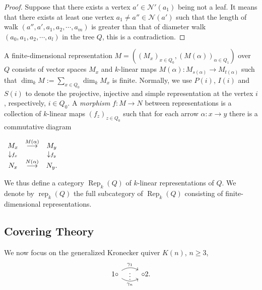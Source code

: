 \documentclass[a4paper,12pt]{amsart}
\DeclareMathOperator{\rep}{rep}
\DeclareMathOperator{\Rep}{Rep}
\begin{document}
\begin{proof}
Suppose that there exists a vertex $a'\in \mathcal{N}'(a_1) $ being not a leaf. It  means that there  exists at least one vertex $a_1 \neq a''\in \mathcal{N}(a')$ such that the length of walk $(a'', a', a_1, a_2, \cdots, a_m)$ is greater than that of diameter walk $(a_0,a_1, a_2,\cdots,a_l)$ in the tree $Q$, this is a contradiction. 
\end{proof}



 A finite-dimensional representation $M=((M_x)_{x\in Q_0}, (M(\alpha))_{\alpha\in Q_1})$ over $Q$ consists of vector spaces $M_{x}$ and $k$-linear maps $M(\alpha): M_{s(\alpha)} \rightarrow M_{t(\alpha)}$ such that $\dim_{k}M:=\sum _{x\in Q_0}\dim_k M_{x}$ is finite. Normally, we use $P(i)$, $I(i)$ and $S(i)$ to denote the projective, injective and simple representation at the vertex $i$, respectively,  $i\in Q_0$. A \textit{morphism} $f: M\rightarrow N$ between representations is a collection of $k$-linear maps $(f_z)_{z\in Q_0}$ such that for each arrow $\alpha: x\rightarrow y$ there is a commutative diagram 

\begin{center}
$\begin{array}[c]{ccc}
M_{x}&\stackrel{M(\alpha)}{\longrightarrow}&M_y\\
\downarrow\scriptstyle{f_x}&&\downarrow\scriptstyle{f_y}\\
N_x&\stackrel{N(\alpha)}{\longrightarrow}&N_y.
\end{array}$
\end{center}
We thus define a category $\Rep_k(Q)$  of  $k$-linear representations  of $Q$.  We denote by $\rep_k(Q)$ the full  subcategory of $\Rep_k(Q)$ consisting of finite-dimensional representations.                                                      
 









\subsection{Covering Theory}
 We now focus on the generalized Kronecker quiver $K(n)$, $n\geq 3$, 
\[
\begin{tikzcd}
    1 \circ
    \arrow[r, draw=none, "{\vdots}" description]
    \arrow[r, bend left,        "\gamma_1"]
    \arrow[r, bend right, swap, "\gamma_n"]
    &
    \circ 2.
\end{tikzcd}
\]
\end{document}
